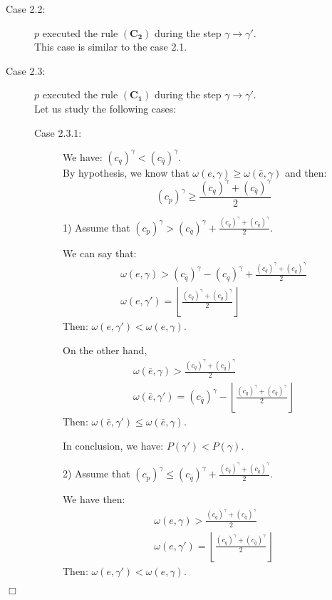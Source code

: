 \documentclass[11pt,english,letterpaper]{article}
\newenvironment{proof}{{\noindent\bf Proof. } }{{\hfill $\Box$}}
\begin{document}
\begin{proof}
\begin{description}
\begin{description}
\item[Case 2.2:] $p$ executed the rule $\boldsymbol{(C_{2})}$ during the step $\gamma\rightarrow\gamma'$.\\
This case is similar to the case 2.1.

\item[Case 2.3:] $p$ executed the rule $\boldsymbol{(C_{1})}$ during the step $\gamma\rightarrow\gamma'$.\\
Let us study the following cases:

\begin{description}
\item[Case 2.3.1:] We have: $\left(c_{q}\right)^{\gamma}<\left(c_{\bar{q}}\right)^{\gamma}$.\\
By hypothesis, we know that $\omega(e,\gamma)\geq\omega(\bar{e},\gamma)$ and then: 
\[\left(c_{p}\right)^{\gamma}\geq\frac{\left(c_{q}\right)^{\gamma}+\left(c_{\bar{q}}\right)^{\gamma}}{2}\]

1) Assume that $\left(c_{p}\right)^{\gamma}>\left(c_{\bar{q}}\right)^{\gamma}+\frac{\left(c_{q}\right)^{\gamma}+\left(c_{\bar{q}}\right)^{\gamma}}{2}$.

We can say that: 
\[\begin{array}{c}\omega(e,\gamma)>\left(c_{\bar{q}}\right)^{\gamma}-\left(c_{q}\right)^{\gamma}+\frac{\left(c_{q}\right)^{\gamma}+\left(c_{\bar{q}}\right)^{\gamma}}{2}\\
\omega(e,\gamma')=\left\lfloor\frac{\left(c_{q}\right)^{\gamma}+\left(c_{\bar{q}}\right)^{\gamma}}{2}\right\rfloor\end{array}\]
Then: $\omega(e,\gamma')<\omega(e,\gamma)$. 

On the other hand,
\[\begin{array}{c}\omega(\bar{e},\gamma)>\frac{\left(c_{q}\right)^{\gamma}+\left(c_{\bar{q}}\right)^{\gamma}}{2}\\
\omega(\bar{e},\gamma')=\left(c_{\bar{q}}\right)^{\gamma}-\left\lfloor\frac{\left(c_{q}\right)^{\gamma}+\left(c_{\bar{q}}\right)^{\gamma}}{2}\right\rfloor\end{array}\]
Then: $\omega(\bar{e},\gamma')\leq\omega(\bar{e},\gamma)$. 

In conclusion, we have: $P(\gamma')<P(\gamma)$.

2) Assume that $\left(c_{p}\right)^{\gamma}\leq\left(c_{\bar{q}}\right)^{\gamma}+\frac{\left(c_{q}\right)^{\gamma}+\left(c_{\bar{q}}\right)^{\gamma}}{2}$.

We have then: 
\[\begin{array}{c}\omega(e,\gamma)>\frac{\left(c_{q}\right)^{\gamma}+\left(c_{\bar{q}}\right)^{\gamma}}{2}\\
\omega(e,\gamma')=\left\lfloor\frac{\left(c_{q}\right)^{\gamma}+\left(c_{\bar{q}}\right)^{\gamma}}{2}\right\rfloor\end{array}\]
Then: $\omega(e,\gamma')<\omega(e,\gamma)$. 


\end{description}
\end{description}
\end{description}
\end{proof}
\end{document}
